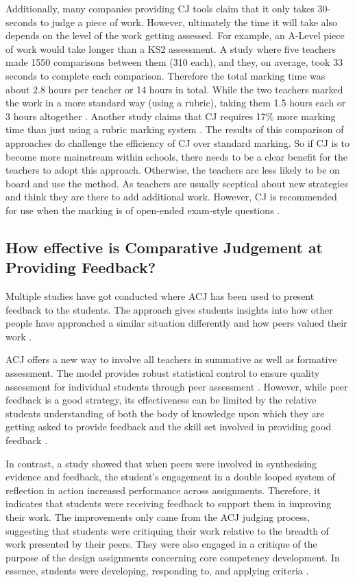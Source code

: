		
		Additionally, many companies providing CJ tools claim that it only takes  30-seconds to judge a piece of work. However, ultimately the time it will take also depends on the level of the work getting assessed. For example, an A-Level piece of work would take longer than a KS2 assessment. A study where five teachers made 1550 comparisons between them (310 each), and they, on average, took 33 seconds to complete each comparison. Therefore the total marking time was about 2.8 hours per teacher or 14 hours in total. While the two teachers marked the work in a more standard way (using a rubric), taking them 1.5 hours each or 3 hours altogether \cite{mcmahon2015comparative}. Another study claims that CJ requires 17\% more marking time than just using a rubric marking system \cite{steedle2016evaluating}. The results of this comparison of approaches do challenge the efficiency of CJ over standard marking. So if CJ is to become more mainstream within schools, there needs to be a clear benefit for the teachers to adopt this approach. Otherwise, the teachers are less likely to be on board and use the method. As teachers are usually sceptical about new strategies and think they are there to add additional work. However, CJ is recommended for use when the marking is of open-ended exam-style questions \cite{steedle2016evaluating}.
	

	\subsection{How effective is Comparative Judgement at Providing Feedback?} %
		Multiple studies have got conducted where ACJ has been used to present feedback to the students. The approach gives students insights into how other people have approached a similar situation differently and how peers valued their work \cite{seery2012validity}. 
		
		ACJ offers a new way to involve all teachers in summative as well as formative assessment. The model provides robust statistical control to ensure quality assessment for individual students through peer assessment \cite{pollitt2012method}. However, while peer feedback is a good strategy, its effectiveness can be limited by the relative students understanding of both the body of knowledge upon which they are getting asked to provide feedback and the skill set involved in providing good feedback \cite{potter2017compair}.
		
		In contrast, a study showed that when peers were involved in synthesising evidence and feedback, the student's engagement in a double looped system of reflection in action increased performance across assignments. Therefore, it indicates that students were receiving feedback to support them in improving their work. The improvements only came from the ACJ judging process, suggesting that students were critiquing their work relative to the breadth of work presented by their peers. They were also engaged in a critique of the purpose of the design assignments concerning core competency development. In essence, students were developing, responding to, and applying criteria \cite{seery2019integrating}.
		
